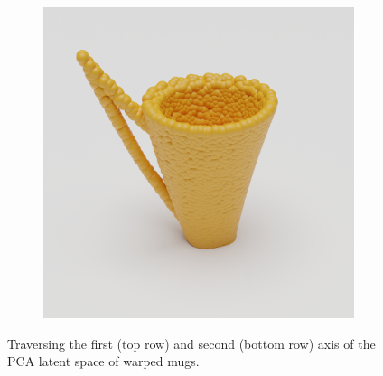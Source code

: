 \documentclass{article}
\begin{document}
\begin{figure}
\begin{subfigure}[b]{0.19\textwidth}
    \end{subfigure}
    \begin{subfigure}[b]{0.19\textwidth}
        \includegraphics[width=\textwidth]{figures/blender/warp3/25.png}
    \end{subfigure}
    \caption{Traversing the first (top row) and second (bottom row) axis of the PCA latent space of warped mugs.}
    \label{fig:latent}
\end{figure}
\end{document}

